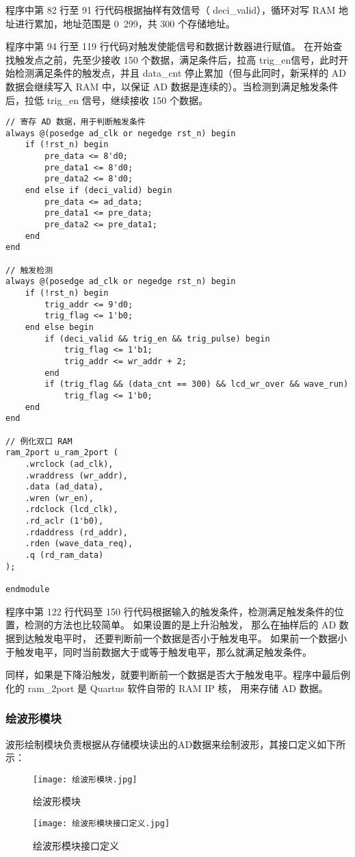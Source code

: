 \documentclass[lang=cn,a4paper,newtx]{elegantpaper}
\begin{document}
程序中第 82 行至 91 行代码根据抽样有效信号（ deci\_valid），循环对写 RAM 地址进行累加，地址范围是 0~299，共 300 个存储地址。

程序中第 94 行至 119 行代码对触发使能信号和数据计数器进行赋值。 在开始查找触发点之前，先至少接收 150 个数据，满足条件后，拉高 trig\_en信号，此时开始检测满足条件的触发点，并且 data\_cnt 停止累加（但与此同时，新采样的 AD 数据会继续写入 RAM 中，以保证 AD 数据是连续的）。当检测到满足触发条件后，拉低 trig\_en 信号，继续接收 150 个数据。
\begin{lstlisting}[firstnumber=121]
// 寄存 AD 数据，用于判断触发条件
always @(posedge ad_clk or negedge rst_n) begin
    if (!rst_n) begin
        pre_data <= 8'd0;
        pre_data1 <= 8'd0;
        pre_data2 <= 8'd0;
    end else if (deci_valid) begin
        pre_data <= ad_data;
        pre_data1 <= pre_data;
        pre_data2 <= pre_data1;
    end
end

// 触发检测
always @(posedge ad_clk or negedge rst_n) begin
    if (!rst_n) begin
        trig_addr <= 9'd0;
        trig_flag <= 1'b0;
    end else begin
        if (deci_valid && trig_en && trig_pulse) begin
            trig_flag <= 1'b1;
            trig_addr <= wr_addr + 2;
        end
        if (trig_flag && (data_cnt == 300) && lcd_wr_over && wave_run)
            trig_flag <= 1'b0;
    end
end

// 例化双口 RAM
ram_2port u_ram_2port (
    .wrclock (ad_clk),
    .wraddress (wr_addr),
    .data (ad_data),
    .wren (wr_en),
    .rdclock (lcd_clk),
    .rd_aclr (1'b0),
    .rdaddress (rd_addr),
    .rden (wave_data_req),
    .q (rd_ram_data)
);

endmodule

\end{lstlisting}
程序中第 122 行代码至 150 行代码根据输入的触发条件，检测满足触发条件的位置，检测的方法也比较简单。 如果设置的是上升沿触发， 那么在抽样后的 AD 数据到达触发电平时， 还要判断前一个数据是否小于触发电平。 如果前一个数据小于触发电平，同时当前数据大于或等于触发电平，那么就满足触发条件。

同样，如果是下降沿触发，就要判断前一个数据是否大于触发电平。程序中最后例化的 ram\_2port 是 Quartus 软件自带的 RAM IP 核， 用来存储 AD 数据。
\subsubsection{绘波形模块}
波形绘制模块负责根据从存储模块读出的AD数据来绘制波形，其接口定义如下所示：
\begin{figure}[ht]
	\begin{minipage}[t]{0.48\textwidth}
		\centering
		\texttt{[image: 绘波形模块.jpg]}
		\caption{绘波形模块}
		\label{fig:绘波形模块}
	\end{minipage}
	\hfill %
	\begin{minipage}[t]{0.48\textwidth}
		\centering
		\texttt{[image: 绘波形模块接口定义.jpg]}
		\caption{绘波形模块接口定义}
		\label{fig:绘波形模块接口定义}
	\end{minipage}
\end{figure}
\end{document}

